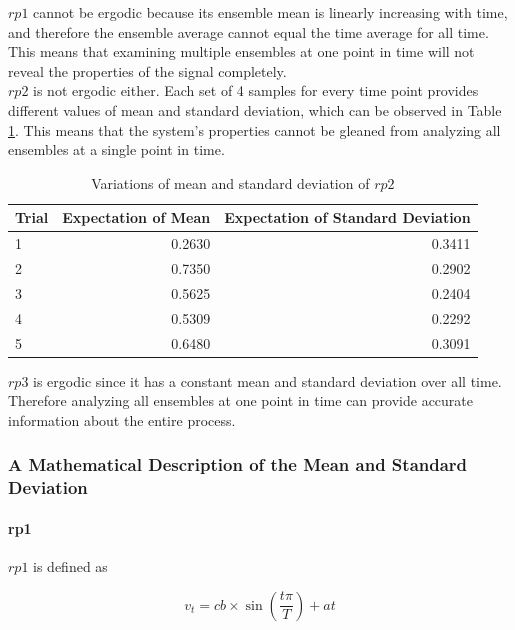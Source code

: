 $rp1$ cannot be ergodic because its ensemble mean is linearly increasing with time, and therefore the ensemble average cannot equal the time average for all time. This means that examining multiple ensembles at one point in time will not reveal the properties of the signal completely.\\

$rp2$ is not ergodic either. Each set of 4 samples for every time point provides different values of mean and standard deviation, which can be observed in Table \ref{fig:rp2}. This means that the system's properties cannot be gleaned from analyzing all ensembles at a single point in time.\\

\begin{table}[h!]
\centering
\begin{tabular}{|l|r|r|} \hline

Trial	&Expectation of Mean	&Expectation of Standard Deviation \\ \hline
1		&0.2630					&0.3411	\\ \hline
2		&0.7350					&0.2902	\\ \hline
3		&0.5625					&0.2404	\\ \hline
4		&0.5309					&0.2292 \\ \hline
5		&0.6480					&0.3091	\\ \hline
\end{tabular}
\caption{\label{fig:rp2} Variations of mean and standard deviation of $rp2$}
\end{table}

$rp3$ is ergodic since it has a constant mean and standard deviation over all time. Therefore analyzing all ensembles at one point in time can provide accurate information about the entire process.

\pagebreak

\subsubsection{A Mathematical Description of the Mean and Standard Deviation}

\paragraph{rp1}

$rp1$ is defined as

\begin{equation}
v_t=cb \times \sin(\frac{t\pi}{T})+at
\end{equation}

